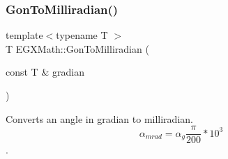 \mbox{\label{group___e_g_x_math-_angle_conversions-_gon_gae5956f7e80b143f3cc22eb8122c1b745}} 
\subsubsection{\texorpdfstring{Gon\+To\+Milliradian()}{GonToMilliradian()}}
{\footnotesize\ttfamily template$<$typename T $>$ \\
T E\+G\+X\+Math\+::\+Gon\+To\+Milliradian (\begin{DoxyParamCaption}\item[{const T \&}]{gradian }\end{DoxyParamCaption})}



Converts an angle in gradian to milliradian. \[\alpha_{mrad}=\alpha_{g}\frac{\pi}{200}*10^3\]. 

